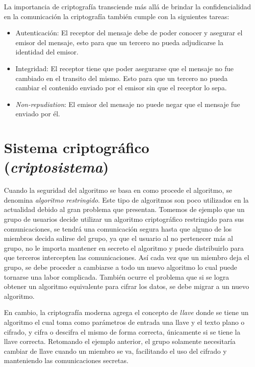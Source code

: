 La importancia de criptografía transciende más allá de brindar la confidencialidad en la comunicación la criptografía también cumple con la siguientes tareas:
\begin{itemize}
\item Autenticación: El receptor del mensaje debe de poder conocer y asegurar el emisor del mensaje, esto para que un tercero no pueda adjudicarse la identidad del emisor.
\item Integridad: El receptor tiene que poder asegurarse que el mensaje no fue cambiado en el transito del mismo. Esto para que un tercero no pueda cambiar el contenido enviado por el emisor sin que el receptor lo sepa.
\item \textit{Non-repudiation}: El emisor del mensaje no puede negar que el mensaje fue enviado por él. 
\end{itemize}

\section{Sistema criptográfico (\textit{criptosistema})}
Cuando la seguridad del algoritmo se basa en como procede el algoritmo, se denomina \textit{algoritmo restringido}. Este tipo de algoritmos son poco utilizados en la actualidad debido al gran problema que presentan. Tomemos de ejemplo que un grupo de usuarios decide utilizar un algoritmo criptográfico restringido para sus comunicaciones, se tendrá una comunicación segura hasta que alguno de los miembros decida salirse del grupo, ya que el usuario al no pertenecer más al grupo, no le importa mantener en secreto el algoritmo y puede distribuirlo para que terceros intercepten las comunicaciones. Así cada vez que un miembro deja el grupo, se debe proceder a cambiarse a todo un nuevo algoritmo lo cual puede tornarse una labor complicada. También ocurre el problema que si se logra obtener un algoritmo equivalente para cifrar los datos, se debe migrar a un nuevo algoritmo.

En cambio, la criptografía moderna \cite{denning} agrega el concepto de \textit{llave} donde se tiene un algoritmo el cual toma como parámetros de entrada una llave y el texto plano o cifrado, y cifra o descifra el mismo de forma correcta, únicamente si se tiene la llave correcta. Retomando el ejemplo anterior, el grupo solamente necesitaría cambiar de llave cuando un miembro se va, facilitando el uso del cifrado y manteniendo las comunicaciones secretas.

